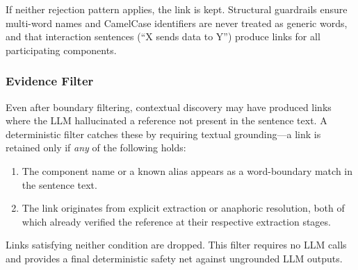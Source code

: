 \noindent If neither rejection pattern applies, the link is kept.
Structural guardrails ensure multi-word names and CamelCase
identifiers are never treated as generic words, and that interaction
sentences (``X sends data to Y'') produce links for all
participating components.

\subsubsection{Evidence Filter}\label{sec:evidence-filter}

Even after boundary filtering, contextual discovery may have
produced links where the LLM hallucinated a reference not
present in the sentence text.
A deterministic filter catches these by requiring textual
grounding---a link is retained only if \emph{any} of the
following holds:
\begin{enumerate}
    \item The component name or a known alias appears as a
      word-boundary match in the sentence text.
    \item The link originates from explicit extraction or anaphoric
      resolution, both of which already verified the reference at
      their respective extraction stages.
\end{enumerate}

\noindent Links satisfying neither condition are dropped.
This filter requires no LLM calls and provides a final
deterministic safety net against ungrounded LLM outputs.
